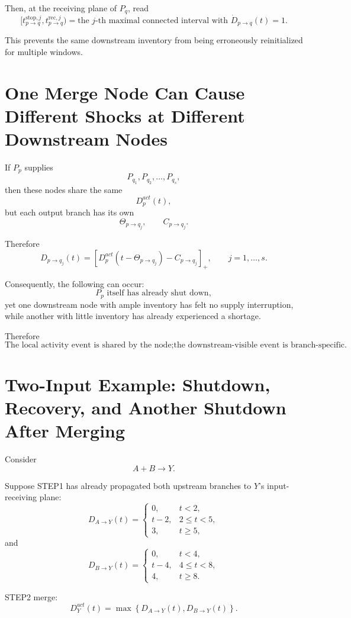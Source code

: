 \documentclass[11pt]{article}
\begin{document}
Then, at the receiving plane of \(P_q\), read
\[
\boxed{
[t_{p\to q}^{\mathrm{stop},j},
t_{p\to q}^{\mathrm{rec},j})
=
\text{the \(j\)-th maximal connected interval with \(\dot D_{p\to q}(t)=1\)}.
}
\tag{23}
\]

This prevents the same downstream inventory from being erroneously reinitialized for multiple windows.

\section{One Merge Node Can Cause Different Shocks at Different Downstream Nodes}

If \(P_p\) supplies
\[
P_{q_1},P_{q_2},\ldots,P_{q_s},
\]
then these nodes share the same
\[
D_p^{act}(t),
\]
but each output branch has its own
\[
\Theta_{p\to q_j},
\qquad
C_{p\to q_j}.
\]

Therefore
\[
\boxed{
D_{p\to q_j}(t)
=
\left[
D_p^{act}(t-\Theta_{p\to q_j})
-
C_{p\to q_j}
\right]_+,
\qquad
j=1,\ldots,s.
}
\tag{24}
\]

Consequently, the following can occur:
\[
P_p\text{ itself has already shut down},
\]
yet one downstream node with ample inventory has felt no supply interruption,
while another with little inventory has already experienced a shortage.

Therefore
\[
\boxed{
\text{The local activity event is shared by the node;}
\text{the downstream-visible event is branch-specific.}
}
\tag{25}
\]

\section{Two-Input Example: Shutdown, Recovery, and Another Shutdown After Merging}

Consider
\[
A+B\longrightarrow Y.
\]

Suppose STEP1 has already propagated both upstream branches to \(Y\)'s input-receiving plane:
\[
D_{A\to Y}(t)
=
\begin{cases}
0, & t<2,\\
t-2, & 2\le t<5,\\
3, & t\ge5,
\end{cases}
\]
and
\[
D_{B\to Y}(t)
=
\begin{cases}
0, & t<4,\\
t-4, & 4\le t<8,\\
4, & t\ge8.
\end{cases}
\]

STEP2 merge:
\[
\boxed{
D_Y^{act}(t)
=
\max\left\{
D_{A\to Y}(t),
D_{B\to Y}(t)
\right\}.
}
\]
\end{document}
